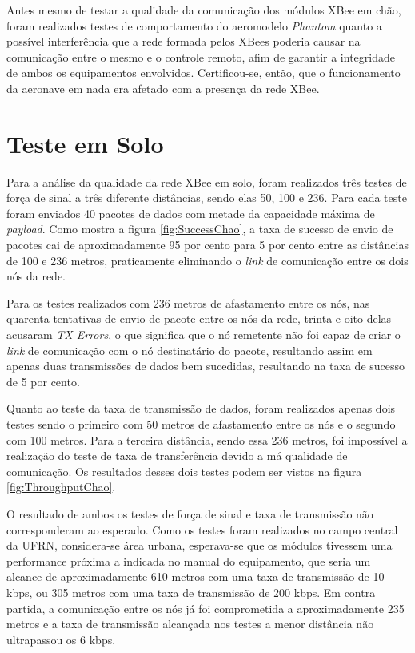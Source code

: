 \label{Cap:Resultados}

Antes mesmo de testar a qualidade da comunicação dos módulos XBee em chão, foram realizados testes de comportamento do aeromodelo \emph{Phantom} quanto a possível interferência que a rede formada pelos XBees poderia causar na comunicação entre o mesmo e o controle remoto, afim de garantir a integridade de ambos os equipamentos envolvidos. Certificou-se, então, que o funcionamento da aeronave em nada era afetado com a presença da rede XBee.

\section{Teste em Solo}

Para a análise da qualidade da rede XBee em solo, foram realizados três testes de força de sinal a três diferente distâncias, sendo elas 50, 100 e 236. Para cada teste foram enviados 40 pacotes de dados com metade da capacidade máxima de \emph{payload}. Como mostra a figura \ref{fig:SuccessChao}, a taxa de sucesso de envio de pacotes cai de aproximadamente 95 por cento para 5 por cento entre as distâncias de 100 e 236 metros, praticamente eliminando o \emph{link} de comunicação entre os dois nós da rede.

Para os testes realizados com 236 metros de afastamento entre os nós, nas quarenta tentativas de envio de pacote entre os nós da rede, trinta e oito delas acusaram \emph{TX Errors}, o que significa que o nó remetente não foi capaz de criar o \emph{link} de comunicação com o nó destinatário do pacote, resultando assim em apenas duas transmissões de dados bem sucedidas, resultando na taxa de sucesso de 5 por cento.

Quanto ao teste da taxa de transmissão de dados, foram realizados apenas dois testes sendo o primeiro com 50 metros de afastamento entre os nós e o segundo com 100 metros. Para a terceira distância, sendo essa 236 metros, foi impossível a realização do teste de taxa de transferência devido a má qualidade de comunicação. Os resultados desses dois testes podem ser vistos na figura \ref{fig:ThroughputChao}.

O resultado de ambos os testes de força de sinal e taxa de transmissão não corresponderam ao esperado. Como os testes foram realizados no campo central da UFRN, considera-se área urbana, esperava-se que os módulos tivessem uma performance próxima a indicada no manual do equipamento, que seria um alcance de aproximadamente 610 metros com uma taxa de transmissão de 10 kbps, ou 305 metros com uma taxa de transmissão de 200 kbps. Em contra partida, a comunicação entre os nós já foi comprometida a aproximadamente 235 metros e a taxa de transmissão alcançada nos testes a menor distância não ultrapassou os 6 kbps. 

